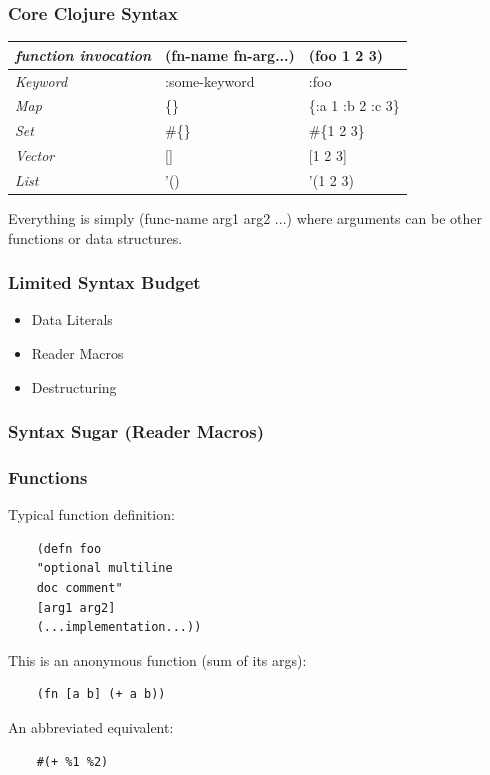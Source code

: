 \documentclass{beamer}
\begin{document}
% 
\begin{frame}
  \frametitle{Core Clojure Syntax}
  \begin{tabularx}{\textwidth}{ |X|X|X| }
    \hline
    \emph{function invocation} & (fn-name fn-arg...)  &  (foo 1 2 3) \\ 
    \hline
    \emph{Keyword} & :some-keyword  & :foo \\ 
    \hline
    \emph{Map} &    \{\}  & \{:a 1 :b 2 :c 3\} \\ 
    \hline
    \emph{Set} &    \#\{\} & \#\{1 2 3\} \\ 
    \hline
    \emph{Vector} & []  & [1 2 3] \\
    \hline
    \emph{List} & '() & '(1 2 3) \\
    \hline
  \end{tabularx}

  \vspace{.5cm}
  Everything is simply (func-name arg1 arg2 ...) where arguments can
  be other functions or data structures. 
\end{frame}

\begin{frame}
  \frametitle{Limited Syntax Budget}
  \begin{itemize}
  \item Data Literals 
  \item Reader Macros
  \item Destructuring
  \end{itemize}
\end{frame}

\begin{frame}
  \frametitle{Syntax Sugar (Reader Macros)}
\end{frame}

\begin{frame}[fragile]
  \frametitle{Functions}
  Typical function definition:
  \begin{verbatim}
    (defn foo 
    "optional multiline 
    doc comment" 
    [arg1 arg2]
    (...implementation...))
  \end{verbatim}
  \vspace{1 cm}

  This is an anonymous function (sum of its args):
  \begin{verbatim}
    (fn [a b] (+ a b))   
  \end{verbatim}
  \vspace{1 cm}

  An abbreviated equivalent:
  \begin{verbatim}
    #(+ %1 %2)
  \end{verbatim}
\end{frame}
\end{document}
